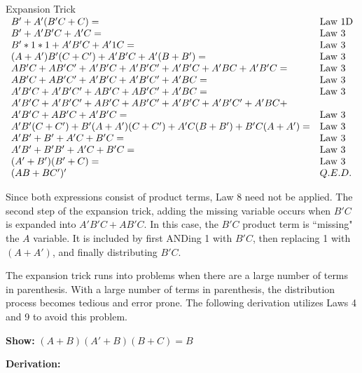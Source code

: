 \begin{process}{Expansion Trick}
$\begin{array}[ht]{ll}
B' + A'(B'C + C) =													& \text{Law 1D} \\
B' + A'B'C + A'C = 												& \text{Law 3} \\
B'*1*1 + A'B'C + A'1C = 											& \text{Law 3} \\
(A+A')B'(C+C') + A'B'C + A'(B+B') =								& \text{Law 3} \\
AB'C + AB'C' + A'B'C + A'B'C' + A'B'C + A'BC + A'B'C = 		& \text{Law 3} \\
AB'C + AB'C' + A'B'C + A'B'C' + A'BC =							& \text{Law 3} \\
A'B'C + A'B'C' + AB'C + AB'C' + A'BC =							& \text{Law 3} \\
A'B'C + A'B'C' + AB'C + AB'C' + A'B'C + A'B'C' + A'BC + 		&				\\
A'B'C + AB'C + A'B'C = 											& \text{Law 3} \\
A'B'(C+C') + B'(A + A')(C + C') + A'C(B+B') + B'C(A+A') =		& \text{Law 3} \\
A'B' + B' + A'C + B'C =											& \text{Law 3} \\
A'B' + B'B' + A'C + B'C =											& \text{Law 3} \\
(A' + B')(B' + C) =													& \text{Law 3} \\
(AB + BC')'		& Q.E.D. \\
\end{array}$

\end{process}


Since both expressions consist of product terms, Law 8 need not be applied.
 The second step of the expansion trick,
adding the missing variable occurs when $B'C$ is expanded 
into $A'B'C + AB'C$.  In this case, the $B'C$ product term is 
``missing" the $A$ variable.  It is included by first ANDing 1 
with $B'C$, then replacing 1 with $(A+A')$, and finally
distributing $B'C$.  



The expansion trick runs into problems when there are a large
number of terms in parenthesis.  With a large number
of terms in parenthesis, the distribution process becomes tedious
and error prone. The following derivation utilizes Laws
4 and 9 to avoid this problem.

\textbf{Show:} $(A+B)(A'+B)(B+C) = B$

\textbf{Derivation:}

